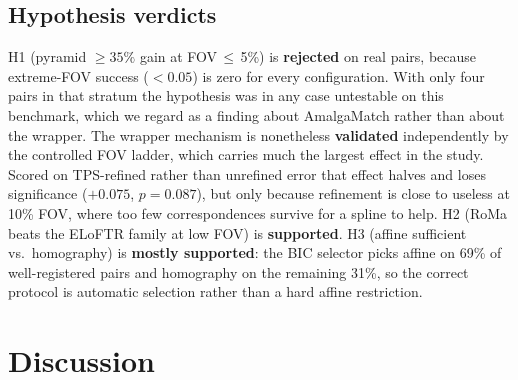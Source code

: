 \documentclass[fleqn,10pt]{wlscirep}
\begin{document}
\subsection*{Hypothesis verdicts}

H1 (pyramid $\ge35\%$ gain at FOV\,$\le$\,5\%) is \textbf{rejected} on real pairs, because extreme-FOV success ($<0.05$) is zero for every configuration. With only four pairs in that stratum the hypothesis was in any case untestable on this benchmark, which we regard as a finding about AmalgaMatch rather than about the wrapper. The wrapper mechanism is nonetheless \textbf{validated} independently by the controlled FOV ladder, which carries much the largest effect in the study. Scored on TPS-refined rather than unrefined error that effect halves and loses significance ($+0.075$, $p=0.087$), but only because refinement is close to useless at 10\% FOV, where too few correspondences survive for a spline to help. H2 (RoMa beats the ELoFTR family at low FOV) is \textbf{supported}. H3 (affine sufficient vs.\ homography) is \textbf{mostly supported}: the BIC selector picks affine on 69\% of well-registered pairs and homography on the remaining 31\%, so the correct protocol is automatic selection rather than a hard affine restriction.

\section*{Discussion}
\end{document}
